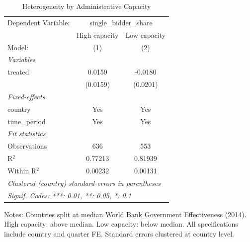 
\begin{table}[htbp]
   \caption{\label{tab:heterogeneity} Heterogeneity by Administrative Capacity}
   \centering
   \begin{tabular}{lcc}
      \tabularnewline \midrule \midrule
      Dependent Variable: & \multicolumn{2}{c}{single\_bidder\_share}\\
                    & High capacity & Low capacity \\   
      Model:        & (1)           & (2)\\  
      \midrule
      \emph{Variables}\\
      treated       & 0.0159        & -0.0180\\   
                    & (0.0159)      & (0.0201)\\   
      \midrule
      \emph{Fixed-effects}\\
      country       & Yes           & Yes\\  
      time\_period  & Yes           & Yes\\  
      \midrule
      \emph{Fit statistics}\\
      Observations  & 636           & 553\\  
      R$^2$         & 0.77213       & 0.81939\\  
      Within R$^2$  & 0.00232       & 0.00131\\  
      \midrule \midrule
      \multicolumn{3}{l}{\emph{Clustered (country) standard-errors in parentheses}}\\
      \multicolumn{3}{l}{\emph{Signif. Codes: ***: 0.01, **: 0.05, *: 0.1}}\\
   \end{tabular}
   
   \par \raggedright 
   Notes: Countries split at median World Bank Government Effectiveness (2014). High capacity: above median. Low capacity: below median. All specifications include country and quarter FE. Standard errors clustered at country level.
\end{table}


